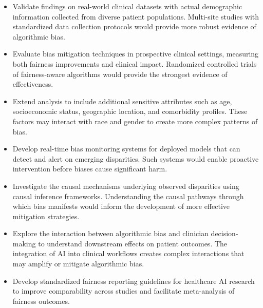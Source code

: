 \begin{itemize}[leftmargin=*]
    \item Validate findings on real-world clinical datasets with actual 
          demographic information collected from diverse patient populations. 
          Multi-site studies with standardized data collection protocols 
          would provide more robust evidence of algorithmic bias.
    \item Evaluate bias mitigation techniques in prospective clinical 
          settings, measuring both fairness improvements and clinical impact. 
          Randomized controlled trials of fairness-aware algorithms would 
          provide the strongest evidence of effectiveness.
    \item Extend analysis to include additional sensitive attributes such 
          as age, socioeconomic status, geographic location, and 
          comorbidity profiles. These factors may interact with race and 
          gender to create more complex patterns of bias.
    \item Develop real-time bias monitoring systems for deployed models 
          that can detect and alert on emerging disparities. Such systems 
          would enable proactive intervention before biases cause 
          significant harm.
    \item Investigate the causal mechanisms underlying observed disparities 
          using causal inference frameworks. Understanding the causal 
          pathways through which bias manifests would inform the development 
          of more effective mitigation strategies.
    \item Explore the interaction between algorithmic bias and clinician 
          decision-making to understand downstream effects on patient 
          outcomes. The integration of AI into clinical workflows creates 
          complex interactions that may amplify or mitigate algorithmic bias.
    \item Develop standardized fairness reporting guidelines for healthcare 
          AI research to improve comparability across studies and facilitate 
          meta-analysis of fairness outcomes.
\end{itemize}
